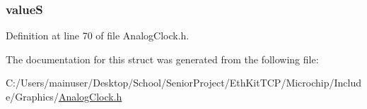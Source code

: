 \hypertarget{struct_a_n_a_l_o_g_c_l_o_c_k_aa7e69d69c7ae58d5d0e5f0c570fde177}{}
\subsubsection[{value\+S}]{ value\+S}\label{struct_a_n_a_l_o_g_c_l_o_c_k_aa7e69d69c7ae58d5d0e5f0c570fde177}


Definition at line 70 of file Analog\+Clock.\+h.



The documentation for this struct was generated from the following file\+:\begin{DoxyCompactItemize}
\item 
C\+:/\+Users/mainuser/\+Desktop/\+School/\+Senior\+Project/\+Eth\+Kit\+T\+C\+P/\+Microchip/\+Include/\+Graphics/\hyperlink{_analog_clock_8h}{Analog\+Clock.\+h}\end{DoxyCompactItemize}
